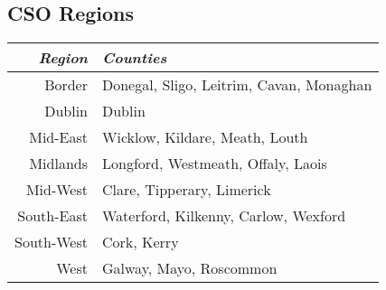 \documentclass[twocolumn]{article}
\begin{document}
\begin{appendices}
\section{CSO Regions}\label{a:regions}
\begin{tabularx}{0.5\textwidth}{r X}
    \textit{Region} & \textit{Counties} \\ \hline
    Border & Donegal, Sligo, Leitrim, Cavan, Monaghan\\ \hline
    Dublin & Dublin\\ \hline
    Mid-East & Wicklow, Kildare, Meath, Louth\\ \hline
    Midlands & Longford, Westmeath, Offaly, Laois\\ \hline
    Mid-West & Clare, Tipperary, Limerick\\ \hline
    South-East & Waterford, Kilkenny, Carlow, Wexford\\ \hline
    South-West & Cork, Kerry\\ \hline
    West & Galway, Mayo, Roscommon
\end{tabularx}
\end{appendices}
\end{document}
